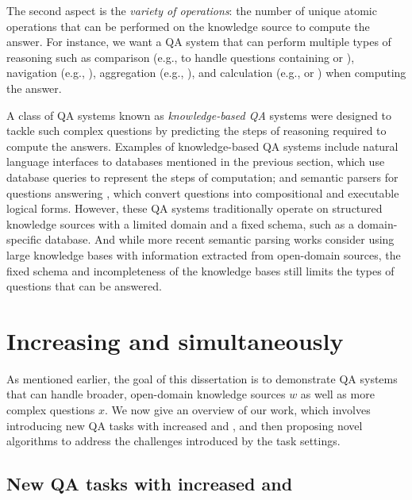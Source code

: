 The second aspect
is the \emph{variety of operations}:
the number of unique atomic operations
that can be performed on the knowledge source
to compute the answer.
For instance,
we want a QA system that can
perform multiple types of reasoning such as
comparison (e.g., to handle questions containing
 or ),
navigation (e.g., ),
aggregation (e.g., ),
and
calculation (e.g.,  or
)
when computing the answer.

A class of QA systems known as
\emph{knowledge-based QA} systems
were designed to tackle such complex questions
by predicting the steps of reasoning required to compute the answers.
Examples of knowledge-based QA systems include
natural language interfaces to databases
mentioned in the previous section,
which use database queries to represent the steps of computation;
and semantic parsers for questions answering
\cite{zelle96geoquery,zettlemoyer07relaxed,liang11dcs},
which convert questions into compositional and executable logical forms.
However, these QA systems traditionally operate on structured knowledge sources
with a limited domain and a fixed schema,
such as a domain-specific database.
And while more recent semantic parsing works
consider using large knowledge bases
with information extracted from open-domain sources,
the fixed schema and incompleteness of the knowledge bases
still limits the types of questions that can be answered.


\section{Increasing \Breadth and \Depth simultaneously}

As mentioned earlier, the goal of this dissertation is to
demonstrate QA systems that can handle broader, open-domain
knowledge sources $w$ as well as more complex questions $x$.
We now give an overview of our work,
which involves introducing new QA tasks
with increased \Breadth and \Depth, and then
proposing novel algorithms to address the challenges
introduced by the task settings.

\subsection{New QA tasks with increased \Breadth and \Depth}

